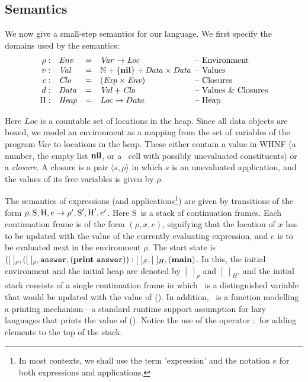 \documentclass[9pt]{sigplanconf}
\newcommand{\stk}{\mbox{S}}       %
\begin{document}
\subsection{Semantics}
We now give  a small-step semantics for our  language.
We first specify the domains used by the semantics:
\[
\begin{array}{rlcl@{\hspace{0.5em}}l}
\rho: & \mathit{Env} &=&\mathit{Var} \rightarrow \mathit{Loc} &
\mbox{-- Environment} \\
v:   & \mathit{Val} &=& \mathbb{N} + \{\NIL\} + \mathit{Data \times
  Data}& \mbox{-- Values}\\
c:   & \mathit{Clo} &=& \mathit{(Exp \times Env)}& \mbox{--
  Closures}\\
d: & \mathit{Data} &=&\mathit{Val} + \mathit{Clo} & \mbox{-- Values \&
  Closures} \\
\heap: & \mathit{Heap} & =&\mathit{Loc} \rightarrow Data & \mbox{--
Heap}
\end{array}
\] 

Here  $\mathit{Loc}$ is  a countable  set  of locations  in the  heap.
Since all data objects are boxed, we model an environment as a mapping
from the set  of variables of the program  $\mathit{Var}$ to locations
in the  heap.  These  either contain  a value in  WHNF (a  number, the
empty  list  $\mbox{$\mathbf{ nil}$}$,  or  a  \CONS\  cell  with  possibly  unevaluated
constituents) or  a {\em  closure}.  A closure  is a pair  $\langle s,
\rho\rangle$  in which  $s$  is an  unevaluated  application, and  the
values of its free variables is given by $\rho$.

The  semantics  of   expressions  (and  applications\footnote{In  most
  contexts, we  shall use  the term 'expression' and the notation $e$  for both  expressions and
  applications.}) are  given by transitions  of the form  $\rho, \stk,
\heap, e \rightarrow \rho', \stk', \heap', e'$.  Here \stk\ is a stack
of  continuation  frames.  Each  continuation  frame  is  of the  form
$(\rho, x, e)$, signifying that the  location of $x$ has to be updated
with the  value of the currently  evaluating expression, and $e$  is to be
evaluated  next  in  the  environment  $\rho$.   The  start  state  is
$([\;]_\rho,([\;]_\rho,  \mathbf{\mbox{\tt answer}},   (\mathbf{print}~\mathbf{\mbox{\tt answer}})):[\;]_{S}  ,  [\;]_{H},
(\mathbf{main})$.  In  this, the initial  environment and the  initial heap
are  denoted  by  $[\;]_\rho$  and  $[\;]_H$, and  the  initial  stack
consists  of  a  single  continuation   frame  in  which  \ans\  is  a
distinguished  variable  that  would  be  updated with  the  value  of
(\mainpgm).  In  addition, \print\ is a function  modelling a printing
mechanism---a standard  runtime support assumption  for lazy languages
that prints the  value of (\mainpgm).  Notice the  use of the operator
$:$ for adding elements to the top of the stack.
\end{document}
